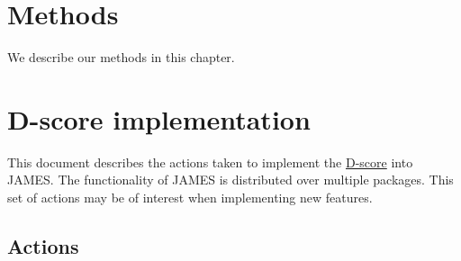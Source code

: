 \documentclass[
]{book}
\begin{document}
\hypertarget{methods}{%
\chapter{Methods}\label{methods}}

We describe our methods in this chapter.

\hypertarget{d-score-implementation}{%
\chapter{D-score implementation}\label{d-score-implementation}}

This document describes the actions taken to implement the \href{https://d-score.org/dbook1/}{D-score} into JAMES. The functionality of JAMES is distributed over multiple packages. This set of actions may be of interest when implementing new features.

\hypertarget{actions}{%
\section{Actions}\label{actions}}
\end{document}

